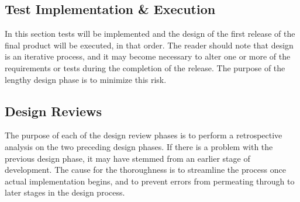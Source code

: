 \documentclass[12pt]{article}
\begin{document}
\subsection{Test Implementation \& Execution}
In this section tests will be implemented and the design of the first release
of the final product will be executed, in that order. The reader should note
that design is an iterative process, and it may become necessary to alter one
or more of the requirements or tests during the completion of the release.
The purpose of the lengthy design phase is to minimize this risk.

\subsection{Design Reviews}
\label{sec:review}
The purpose of each of the design review phases is to perform a retrospective
analysis on the two preceding design phases. If there is a problem with the
previous design phase, it may have stemmed from an earlier stage of
development. The cause for the thoroughness is to streamline the process once
actual implementation begins, and to prevent errors from permeating through to
later stages in the design process.
\end{document}
